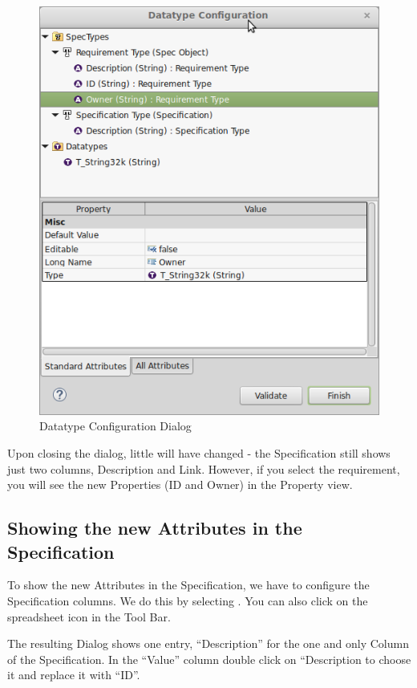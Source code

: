 \begin{figure}[h!]
\centering
\includegraphics[width=0.8\linewidth]{../rmf-images/datatype.png}
\caption{Datatype Configuration Dialog}
\label{fig:datatype_configuration}
\end{figure}

Upon closing the dialog, little will have changed - the Specification still shows just two columns, Description and Link.  However, if you select the requirement, you will see the new Properties (ID and Owner) in the Property view.

\subsection{Showing the new Attributes in the Specification}

To show the new Attributes in the Specification, we have to configure the Specification columns.  We do this by selecting .  You can also click on the spreadsheet icon in the Tool Bar.

The resulting Dialog shows one entry, ``Description'' for the one and only Column of the Specification.  In the ``Value'' column double click on ``Description to choose it and replace it with ``ID''.

